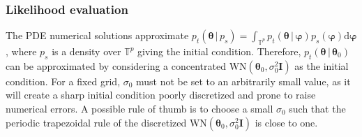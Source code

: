 \documentclass[oneside,11pt]{article}
\newcommand{\T}{\mathbb{T}}
\newcommand{\rd}{\mathrm{d}}
\newcommand{\bphi}{\boldsymbol\varphi}
\newcommand{\btheta}{\boldsymbol\theta}
\newcommand{\bI}{\mathbf{I}}
\begin{document}
\subsubsection{Likelihood evaluation}

The PDE numerical solutions approximate $p_t(\btheta\,|\,p_s)=\int_{\T^p}p_t(\btheta\,|\,\bphi)\allowbreak p_s(\bphi)\rd\bphi$, where $p_s$ is a density over $\T^p$ giving the initial condition. Therefore, $p_t(\btheta\,|\,\btheta_0)$ can be approximated by considering a concentrated $\mathrm{WN}(\btheta_0,\sigma^2_0\bI)$ as the initial condition. For a fixed grid, $\sigma_0$ must not be set to an arbitrarily small value, as it will create a sharp initial condition poorly discretized and prone to raise numerical errors. A possible rule of thumb is to choose a small $\sigma_0$ such that the periodic trapezoidal rule of the discretized  $\mathrm{WN}(\btheta_0,\sigma^2_0\bI)$ is close to one. \\
\end{document}
